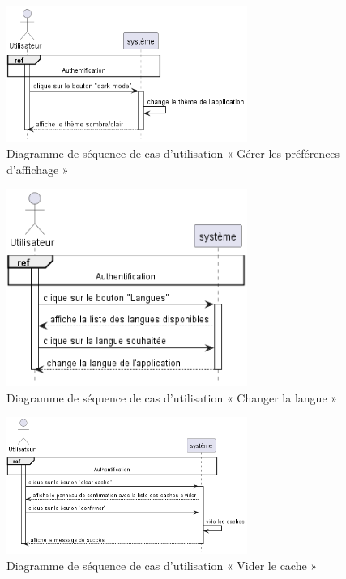 \begin{figure}[H]
  \centering
  \includegraphics[width=0.7\textwidth]{out/diagrams/sprint6/preferance_affichage/preferance_affichage}
  \caption{Diagramme de séquence de cas d'utilisation « Gérer les préférences d'affichage »}
  \label{fig:sequence_preference_affichage}
\end{figure}


\begin{figure}[H]
  \centering
  \includegraphics[width=0.7\textwidth]{out/diagrams/sprint6/change_language/change_language}
  \caption{Diagramme de séquence de cas d'utilisation « Changer la langue »}
  \label{fig:sequence_change_language}
\end{figure}

\begin{figure}[H]
  \centering
  \includegraphics[width=0.7\textwidth]{out/diagrams/sprint6/clear_cache/clear_cache}
  \caption{Diagramme de séquence de cas d'utilisation « Vider le cache »}
  \label{fig:sequence_clear_cache}
\end{figure}

